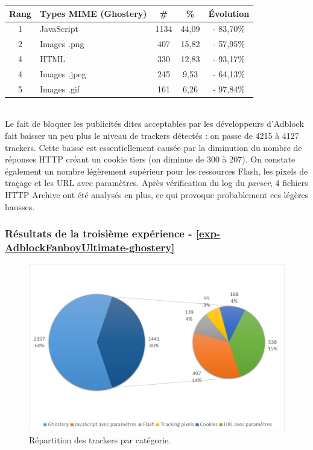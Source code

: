 \begin{tabular}{ c | p{5cm} | c | c | c | }
   Rang & Types MIME (Ghostery) & \# & \% & Évolution\\
   \hline
   \hline
   1 & JavaScript & 1134 & 44,09 & - 83,70\% \\
   2 & Images .png & 407 & 15,82 & - 57,95\% \\
   4 & HTML & 330 & 12,83 & - 93,17\% \\
   4 & Images .jpeg & 245 & 9,53 & - 64,13\% \\
   5 & Images .gif & 161 & 6,26 & - 97,84\% \\
   \hline
\end{tabular}
\\[.3cm]

Le fait de bloquer les publicités dites acceptables par les développeurs d'Adblock fait baisser un peu plus le niveau de trackers détectés : on passe de 4215 à 4127 trackers. Cette baisse est essentiellement causée par la diminution du nombre de réponses HTTP créant un cookie tiers (on diminue de 300 à 207). On constate également un nombre légèrement supérieur pour les ressources Flash, les pixels de traçage et les URL avec paramètres. Après vérification du log du \textit{parser}, 4 fichiers HTTP Archive ont été analysés en plus, ce qui provoque probablement ces légères hausses.

\subsubsection{Résultats de la troisième expérience - \autoref{exp-AdblockFanboyUltimate-ghostery}}
\begin{figure}[!h]
	\centering
	\includegraphics[scale=.6]{resultats/ANALYSES/Images/AdblockFanboyUltimate-Ghostery.png}
	\caption{\label{exp-AdblockFanboyUltimate-ghostery}Répartition des trackers par catégorie.}
\end{figure}

